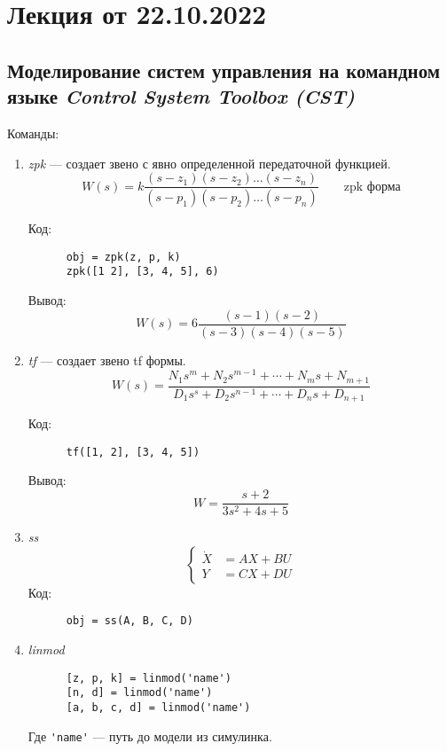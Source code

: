 
\section{Лекция от 22.10.2022}
\subsection{Моделирование систем управления на командном языке \textit{Control
System Toolbox (CST)}}
Команды:
\begin{enumerate}
  \item \textit{zpk} --- создает звено с явно определенной передаточной функцией.
    \[
      W(s) = k \frac{(s-z_1)(s-z_2)\ldots(s-z_n)}{(s-p_1)(s-p_2)\ldots(s-p_n)}
      \qquad \text{zpk форма}
    \] 
    \par Код:
    \begin{verbatim}
      obj = zpk(z, p, k)
      zpk([1 2], [3, 4, 5], 6)
    \end{verbatim}
    Вывод:
    \[
      W(s) = 6 \frac{(s-1)(s-2)}{(s-3)(s-4)(s-5)}
    \] 
  \item \textit{tf} --- создает звено tf формы.
    \[
      W(s) = \frac{N_1 s^{m} + N_2 s^{m-1} + \cdots + N_m s + N_{m+1}}{D_1 s^{s}
      + D_2 s^{n-1} + \cdots + D_ns + D_{n+1}}
    \] \par
    Код:
    \begin{verbatim}
      tf([1, 2], [3, 4, 5])
    \end{verbatim}
    Вывод:
    \[
      W = \frac{s+2}{3s^2 + 4s + 5} 
    \] 
  \item \textit{ss}
    \[
      \left\{\begin{aligned} 
        \dot X &= AX + BU\\
        Y &= CX + DU
      \end{aligned}\right. 
    \] 
    Код:
    \begin{verbatim}
      obj = ss(A, B, C, D) 
    \end{verbatim}

  \item \textit{linmod}
    \begin{verbatim}
      [z, p, k] = linmod('name')
      [n, d] = linmod('name')
      [a, b, c, d] = linmod('name')
    \end{verbatim}
    Где \verb!'name'! --- путь до модели из симулинка.


\end{enumerate}
